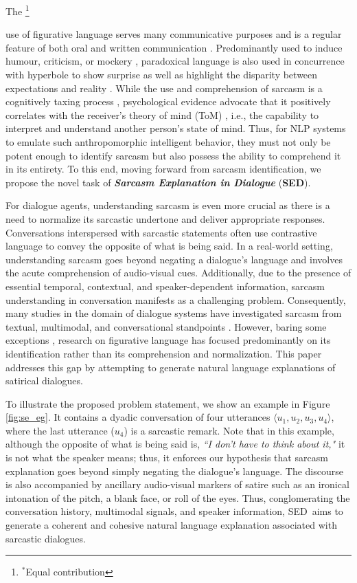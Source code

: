 \documentclass[11pt]{article}
\newcommand{\task}{\textsc{SED}}
\newcommand\blfootnote[1]{\begingroup
  \renewcommand\thefootnote{}\footnote{#1}\addtocounter{footnote}{-1}\endgroup
}
\begin{document}
The\blfootnote{$^*$Equal contribution} use of figurative language serves many communicative purposes and is a regular feature of both oral and written communication \citep{roberts1994people}. 
Predominantly used to induce humour, criticism, or mockery \citep{colston1997salting}, paradoxical language is also used in concurrence with hyperbole to show surprise \citep{colston1998you} as well as highlight the disparity between expectations and reality \citep{ivanko2003context}. While the use and comprehension of sarcasm is a cognitively taxing process \citep{olkoniemi2016individual}, psychological evidence advocate that it positively correlates with the receiver's theory of mind (ToM) \citep{wellman2014making}, i.e., the capability to interpret and understand another person's state of mind. Thus, for NLP systems to emulate such anthropomorphic intelligent behavior, they must not only be potent enough to identify sarcasm but also possess the ability to comprehend it in its entirety. To this end, moving forward from sarcasm identification, we propose the novel task of \textit{\textbf{Sarcasm Explanation in Dialogue}} ({\bf \task}).

For dialogue agents, understanding sarcasm is even more crucial as there is a need to normalize its sarcastic undertone and deliver appropriate responses. Conversations interspersed with sarcastic statements often use contrastive language to convey the opposite of what is being said. In a real-world setting, understanding sarcasm goes beyond negating a dialogue's language and involves the acute comprehension of audio-visual cues. Additionally, due to the presence of essential temporal, contextual, and speaker-dependent information, sarcasm understanding in conversation manifests as a challenging problem. Consequently, many studies in the domain of dialogue systems have investigated sarcasm from textual, multimodal, and conversational standpoints \cite{10.1162/coli_a_00336, castro2019multimodal, oraby2017serious, 9442359}. However, baring some exceptions \citep{mishra-etal-2019-modular, dubey2019deep, chakrabarty-etal-2020-r}, research on figurative language has focused predominantly on its identification rather than its comprehension and normalization. This paper addresses this gap by attempting to generate natural language explanations of satirical dialogues.

To illustrate the proposed problem statement, we show an example in Figure \ref{fig:se_eg}. It contains a dyadic conversation of four utterances $\langle u_1, u_2, u_3, u_4\rangle$, where the last utterance ($u_4$) is a sarcastic remark. Note that in this example, although the opposite of what is being said is, \textit{``I don't have to think about it,"} it is not what the speaker means; thus, it enforces our hypothesis that sarcasm explanation goes beyond simply negating the dialogue's language. The discourse is also accompanied by ancillary audio-visual markers of satire such as an ironical intonation of the pitch, a blank face, or roll of the eyes. Thus, conglomerating the conversation history, multimodal signals, and speaker information,  \task\ aims to generate a coherent and cohesive natural language explanation associated with sarcastic dialogues.
\end{document}

